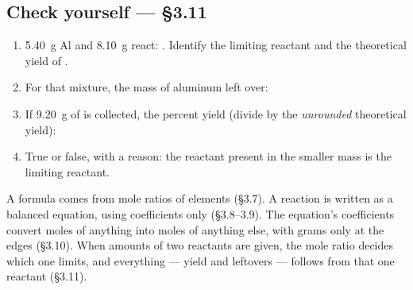 \documentclass{apchem-worksheet}
\begin{document}
\subsection*{\sffamily Check yourself --- \S3.11}

\begin{enumerate}[leftmargin=*,itemsep=0.4em]
  \item \SI{5.40}{\gram} Al and \SI{8.10}{\gram}  react:
        . Identify the limiting reactant and the
        theoretical yield of . \workspace[3cm]
  \item For that mixture, the mass of aluminum left over:
        \workspace[2.2cm]
  \item If \SI{9.20}{\gram} of  is collected, the percent
        yield (divide by the \emph{unrounded} theoretical yield):
  \item True or false, with a reason: the reactant present in the
        smaller mass is the limiting reactant.
\end{enumerate}

\begin{apcnote}
A formula comes from mole ratios of elements (\S3.7). A reaction is
written as a balanced equation, using coefficients only (\S3.8--3.9). The
equation's coefficients convert moles of anything into moles of anything
else, with grams only at the edges (\S3.10). When amounts of two reactants
are given, the mole ratio decides which one limits, and everything ---
yield and leftovers --- follows from that one reactant (\S3.11).
\end{apcnote}
\end{document}
